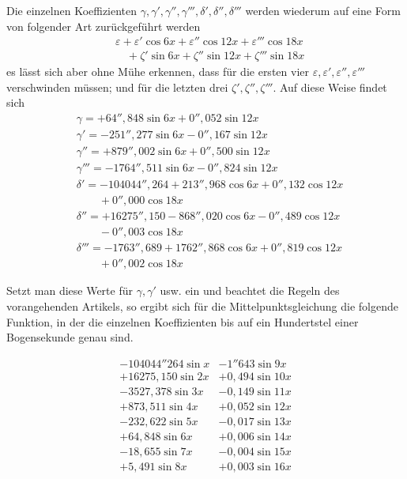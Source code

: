 Die einzelnen Koeffizienten \(\gamma,\gamma',\gamma'',\gamma''',\delta',\delta'',\delta'''\) werden wiederum auf eine Form von folgender Art zurückgeführt werden
\[
\begin{aligned}
&\varepsilon+\varepsilon'\cos 6x+\varepsilon''\cos 12x+\varepsilon'''\cos 18x\\[6pt]
&\quad+\zeta'\sin 6x+\zeta''\sin 12x+\zeta'''\sin 18x
\end{aligned}
\]
es lässt sich aber ohne Mühe erkennen, dass für die ersten vier \(\varepsilon,\varepsilon',\varepsilon'',\varepsilon'''\) verschwinden müssen; und für die letzten drei \(\zeta',\zeta'',\zeta'''\). Auf diese Weise findet sich
\[
\begin{aligned}
&\gamma=+64''{,}848\sin 6x+0''{,}052\sin 12x\\[6pt]
&\gamma'=-251''{,}277\sin 6x-0''{,}167\sin 12x\\[6pt]
&\gamma''=+879''{,}002\sin 6x+0''{,}500\sin 12x\\[6pt]
&\gamma'''=-1764''{,}511\sin 6x-0''{,}824\sin 12x\\[6pt]
&\delta'=-104044''{,}264+213''{,}968\cos 6x+0''{,}132\cos 12x\\[6pt]
&\qquad{}+0''{,}000\cos 18x\\[6pt]
&\delta''=+16275''{,}150-868''{,}020\cos 6x-0''{,}489\cos 12x\\[6pt]
&\qquad{}-0''{,}003\cos 18x\\[6pt]
&\delta'''=-1763''{,}689+1762''{,}868\cos 6x+0''{,}819\cos 12x\\[6pt]
&\qquad{}+0''{,}002\cos 18x
\end{aligned}
\]

Setzt man diese Werte für \(\gamma,\gamma'\) usw. ein und beachtet die Regeln des vorangehenden Artikels, so ergibt sich für die Mittelpunktsgleichung die folgende Funktion, in der die einzelnen Koeffizienten bis auf ein Hundertstel einer Bogensekunde genau sind.


\[
\begin{array}{r|r}
-104044''264\sin x&-1''643\sin 9x\\
+16275{,}150\sin 2x&+0{,}494\sin 10x\\
-3527{,}378\sin 3x&-0{,}149\sin 11x\\
+873{,}511\sin 4x&+0{,}052\sin 12x\\
-232{,}622\sin 5x&-0{,}017\sin 13x\\
+64{,}848\sin 6x&+0{,}006\sin 14x\\
-18{,}655\sin 7x&-0{,}004\sin 15x\\
+5{,}491\sin 8x&+0{,}003\sin 16x
\end{array}
\]


